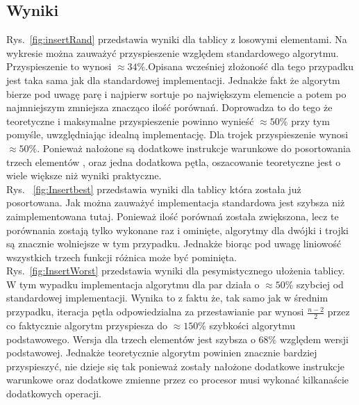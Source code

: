 \subsection{Wyniki}
\par Rys.~\ref{fig:insertRand} przedstawia wyniki dla tablicy z losowymi elementami. Na wykresie można zauważyć przyspieszenie względem standardowego algorytmu. Przyspieszenie to wynosi $ \approx 34 \% $.Opisana wcześniej złożoność dla tego przypadku jest taka sama jak dla standardowej implementacji. Jednakże fakt że algorytm bierze pod uwagę parę i najpierw sortuje po największym elemencie a potem po najmniejszym zmniejsza znacząco ilość porównań. Doprowadza to do tego że teoretyczne i maksymalne przyspieszenie powinno wynieść $ \approx 50\% $ przy tym pomyśle, uwzględniając idealną implementację. Dla trojek przyspieszenie wynosi $\approx 50\%$. Ponieważ nałożone są dodatkowe instrukcje warunkowe do posortowania trzech elementów , oraz jedna dodatkowa pętla, oszacowanie teoretyczne jest o wiele większe niż wyniki praktyczne.\\
 Rys. ~\ref{fig:Insertbest} przedstawia wyniki dla tablicy która została już posortowana. Jak można zauważyć implementacja standardowa jest szybsza niż zaimplementowana tutaj. Ponieważ ilość porównań została zwiększona, lecz te porównania zostają tylko wykonane raz i ominięte, algorytmy dla dwójki i trojki są znacznie wolniejsze w tym przypadku. Jednakże biorąc pod uwagę liniowość wszystkich trzech funkcji różnica może być pominięta.\\
 Rys.~\ref{fig:InsertWorst} przedstawia wyniki dla pesymistycznego ułożenia tablicy. W tym wypadku implementacja algorytmu dla par działa o $\approx 50 \% $ szybciej od standardowej implementacji. Wynika to z faktu że, tak samo jak w średnim przypadku, iteracja pętla odpowiedzialna za przestawianie par wynosi $\frac{n-2}{2}$ przez co faktycznie algorytm przyspiesza do $\approx 150 \% $ szybkości algorytmu podstawowego. Wersja dla trzech elementów jest szybsza o $68\%$ względem wersji podstawowej. Jednakże teoretycznie algorytm powinien znacznie bardziej przyspieszyć, nie dzieje się tak ponieważ zostały nałożone dodatkowe instrukcje warunkowe oraz dodatkowe zmienne przez co procesor musi wykonać kilkanaście dodatkowych operacji.

